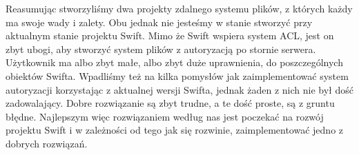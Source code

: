 	Reasumując stworzyliśmy dwa projekty zdalnego systemu plików, z których każdy ma swoje wady i zalety. Obu jednak nie jesteśmy w stanie stworzyć przy aktualnym stanie projektu Swift. Mimo że Swift wspiera system ACL, jest on zbyt ubogi, aby stworzyć system plików z autoryzacją po stornie serwera. Użytkownik ma albo zbyt małe, albo zbyt duże uprawnienia, do poszczególnych obiektów Swifta. Wpadliśmy też na kilka pomysłów jak zaimplementować system autoryzacji korzystając z aktualnej wersji Swifta, jednak żaden z nich nie był dość zadowalający. Dobre rozwiązanie są zbyt trudne, a te dość proste, są z gruntu błędne. Najlepszym więc rozwiązaniem według nas jest poczekać na rozwój projektu Swift i w zależności od tego jak się rozwinie, zaimplementować jedno z dobrych rozwiązań.



